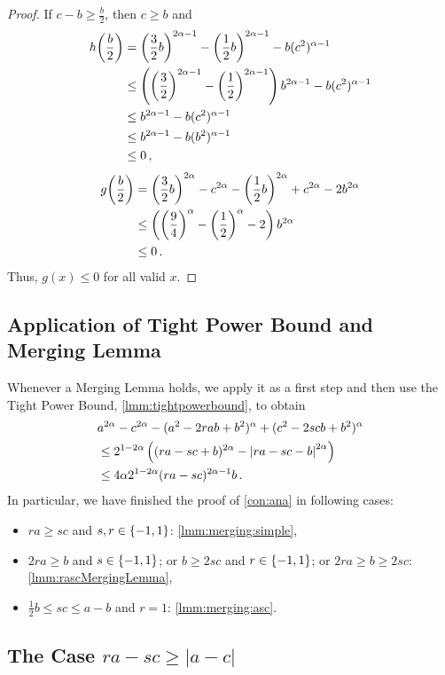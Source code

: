 \begin{proof}
	If $c-b\geq\frac b2$, then $c\geq b$ and
	\begin{align*}
		h\!\left( \frac b2 \right) 
		&= 
		\left( \frac32 b \right)^{2\alpha-1}-\left( \frac12 b \right)^{2\alpha-1}-b(c^2)^{\alpha -1}
		\\&\leq 
		\left( \left( \frac32 \right)^{2\alpha-1}-\left( \frac12 \right)^{2\alpha-1} \right) b^{2\alpha-1}-b(c^2)^{\alpha -1}
		\\&\leq 
		b^{2\alpha-1}-b(c^2)^{\alpha -1}
		\\&\leq 
		b^{2\alpha-1}-b(b^2)^{\alpha -1}
		\\&\leq
		0\, ,
	\end{align*}
	\begin{align*}
		g\!\left( \frac b2 \right) 
		&=
		\left( \frac32b \right)^{2\alpha}-c^{2\alpha}-\left( \frac12b \right)^{2\alpha}+c^{2\alpha}
				- 2 b^{2\alpha} 
		\\&\leq 
		\left( \left( \frac94 \right)^\alpha-\left( \frac12 \right)^\alpha-2 \right) b^{2\alpha}
		\\&\leq 
		0
		\, .
	\end{align*}
	Thus, $g(x)\leq 0$ for all valid $x$.
\end{proof}
%
%
%
%
\subsection{Application of Tight Power Bound and Merging Lemma} \label{ssec:apply}
%
Whenever a Merging Lemma holds, we apply it as a first step and then use the Tight Power Bound, \autoref{lmm:tightpowerbound}, to obtain
\begin{align*}
	&a^{2\alpha}-c^{2\alpha}-(a^2-2rab+b^2)^{\alpha} + (c^2 - 2 s c b + b^2)^\alpha 
	\\&\leq 
	2^{1-2\alpha} \left( (ra - s c + b)^{2\alpha}-\left| ra - s c - b \right|^{2\alpha} \right)
	\\& \leq 
	4\alpha 2^{1-2\alpha} (ra - s c)^{2\alpha-1} b
	\, .
\end{align*}	
In particular, we have finished the proof of \autoref{con:ana} in following cases:
\begin{itemize}
\item $ra\geq sc$ and $s, r \in \left\lbrace -1,1 \right\rbrace$: \autoref{lmm:merging:simple},
\item $2ra \geq b$ and $s\in\left\lbrace -1,1 \right\rbrace$; or $b \geq 2sc$ and $r\in\left\lbrace -1,1 \right\rbrace$; or  $2ra \geq b \geq 2sc$: \autoref{lmm:rascMergingLemma}, 
\item $\frac12 b \leq sc\leq a-b$ and $r=1$: \autoref{lmm:merging:asc}.
\end{itemize}
%
%
%
\subsection{The Case $ra-sc\geq |a-c|$} \label{ssec:rascgeqac}
%
